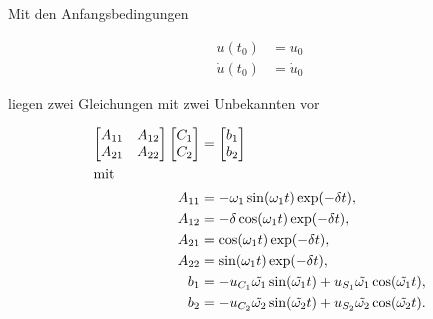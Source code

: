 \begin{solution}
    Mit den Anfangsbedingungen

    \begin{align*}
        u(t_0) &= u_0 \\
        \dot{u}(t_0) &= \dot{u}_0
    \end{align*}

    liegen zwei Gleichungen mit zwei Unbekannten vor

    \begin{align*}
        \begin{bmatrix}
            A_{11} & A_{12}\\
            A_{21} & A_{22}
        \end{bmatrix}
        \begin{bmatrix}
            C_1 \\
            C_2
        \end{bmatrix}
        &=
        \begin{bmatrix}
        b_1 \\
        b_2
        \end{bmatrix} \\
        \intertext{mit}
            A_{11}&= -\omega_1 \sin(\omega_1 t) \exp(-\delta t),\\
            A_{12}&= - \delta \cos(\omega_1 t) \exp(-\delta t),\\
            A_{21}&= \cos(\omega_1 t) \exp(-\delta t),\\
            A_{22}&= \sin(\omega_1 t) \exp(-\delta t),\\
            b_{1}&= -u_{C_1} \tilde{\omega_1} \sin(\tilde{\omega_1}t) + u_{S_1} \tilde{\omega_1} \cos(\tilde{\omega_1}t),\\
            b_{2}&= -u_{C_2} \tilde{\omega_2} \sin(\tilde{\omega_2}t) + u_{S_2} \tilde{\omega_2} \cos(\tilde{\omega_2}t).
    \end{align*}


\end{solution}
